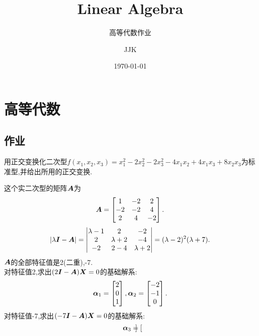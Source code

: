\documentclass[lang=cn,11pt,normal]{elegantbook}
\title{Linear Algebra}
\subtitle{高等代数作业}
\author{JJK}
\institute{Jiang Xi science and technology University}
\date{\today}
\begin{document}
	\maketitle
	\mainmatter
	\hypersetup{pageanchor=true}
	\chapter{高等代数}
	\section{作业}
	\begin{exercise}
		用正交变换化二次型$f(x_1,x_2,x_3)=x_1^2-2x_2^2-2x_3^2-4x_1x_2+4x_1x_3+8x_2x_3$为标准型,并给出所用的正交变换.
	\end{exercise}
	\begin{solution}
		这个实二次型的矩阵$\AA$为\\
		\begin{equation}
			\AA=
			\begin{bmatrix}
			1&-2&2\\
			-2&-2&4\\
			2&4&-2
			\end{bmatrix}.
		\end{equation}
		\begin{equation}
			|\lambda\II-\AA|=
			\begin{vmatrix}
			\lambda-1&2&-2\\
			2&\lambda+2&-4\\
			-2&2-4&\lambda+2
			\end{vmatrix}
			=(\lambda-2)^2(\lambda+7).
		\end{equation}
		$\AA$的全部特征值是2(二重),-7.\\
		对特征值2,求出$(2\II-\AA)\XX=0$的基础解系:
		\begin{equation}
		\bfaf_1=
		\begin{bmatrix}
		2\\
		0\\
		1
		\end{bmatrix},
		\bfaf_2=
		\begin{bmatrix}
		-2\\
		-1\\
		0
		\end{bmatrix}.
		\end{equation}
		对特征值-7,求出$(-7\II-\AA)\XX=0$的基础解系:\\
		\begin{equation}
		\bfaf_3=
		\begin{bmatrix}

\end{bmatrix}
\end{equation}
\end{solution}
\end{document}
